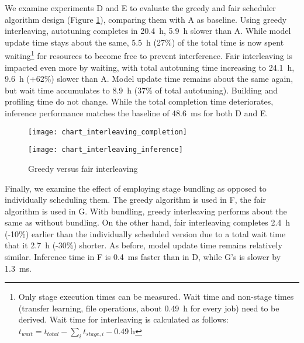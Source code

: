 We examine experiments D and E to evaluate the greedy and fair scheduler algorithm design (Figure \ref{fig:chart-interleaving}), comparing them with A as baseline. Using greedy interleaving, autotuning completes in \SI{20.4}{\hour}, \SI{5.9}{\hour} slower than A. While model update time stays about the same, \SI{5.5}{\hour} (27\%) of the total time is now spent waiting\footnote{Only stage execution times can be measured. Wait time and non-stage times (transfer learning, file operations, about \SI{0.49}{\hour} for every job) need to be derived. Wait time for interleaving is calculated as follows: $t_{wait} = t_{total} - \sum_{i}t_{stage,i} - \SI{0.49}{\hour}$} for resources to become free to prevent interference. Fair interleaving is impacted even more by waiting, with total autotuning time increasing to \SI{24.1}{\hour}, \SI{9.6}{\hour} (+62\%) slower than A. Model update time remains about the same again, but wait time accumulates to \SI{8.9}{\hour} (37\% of total autotuning). Building and profiling time do not change. While the total completion time deteriorates, inference performance matches the baseline of \SI{48.6}{\milli\second} for both D and E.

\begin{figure}[t]
	\begin{minipage}[b]{.6\textwidth}
		\centering\texttt{[image: chart\_interleaving\_completion]}
		\label{fig:chart-interleaving-completion}
	\end{minipage}%
	\hfill
	\begin{minipage}[b]{.35\textwidth}
		\centering\texttt{[image: chart\_interleaving\_inference]}
		\label{fig:chart-interleaving-inference}
	\end{minipage}
	\caption[Results of greedy versus fair interleaving]{Greedy versus fair interleaving}
	\label{fig:chart-interleaving}
\end{figure}

Finally, we examine the effect of employing stage bundling as opposed to individually scheduling them. The greedy algorithm is used in F, the fair algorithm is used in G. With bundling, greedy interleaving performs about the same as without bundling. On the other hand, fair interleaving completes \SI{2.4}{\hour} (-10\%) earlier than the individually scheduled version due to a total wait time that it \SI{2.7}{\hour} (-30\%) shorter. As before, model update time remains relatively similar. Inference time in F is \SI{0.4}{\milli\second} faster than in D, while G's is slower by \SI{1.3}{\milli\second}.

